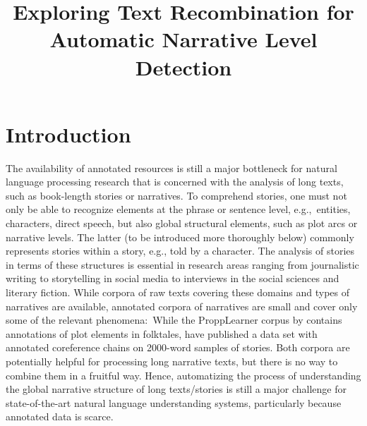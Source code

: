 \documentclass[10pt, a4paper]{article}
\title{Exploring Text Recombination for Automatic Narrative Level Detection}
\newcommand{\sina}[1]{\textit{\textcolor{blue}{sina: #1}}}
\newcommand{\nils}[1]{\textit{\textcolor{violet}{nils: #1}}}
\begin{document}
\maketitleabstract

\section{Introduction}
\label{sec:introduction}



The availability of annotated resources is still a major bottleneck for natural language processing research that is concerned with the analysis of long texts, such as book-length stories or narratives.   
To comprehend stories, one must not only be able to recognize elements at the phrase or sentence level, e.g.,~entities, characters, direct speech, but also global structural elements, such as plot arcs or narrative levels. The latter (to be introduced more thoroughly below) commonly represents stories within a story, e.g., told by a character. %
The analysis of stories in terms of these structures is essential in research areas ranging from journalistic writing to storytelling in social media to interviews in the social sciences and literary fiction. 
While corpora of raw texts covering these domains and types of narratives are available, annotated corpora of narratives are small and cover only some of the relevant phenomena:~While the ProppLearner corpus by  contains annotations of plot elements in folktales,  have published a data set with annotated coreference chains on 2000-word samples of stories. Both corpora are potentially helpful for processing long narrative texts, but there is no way to combine them in a fruitful way.
Hence, automatizing the process of understanding the global narrative structure of long texts/stories is still a major challenge for state-of-the-art natural language understanding systems, particularly because annotated data is scarce.
\end{document}
